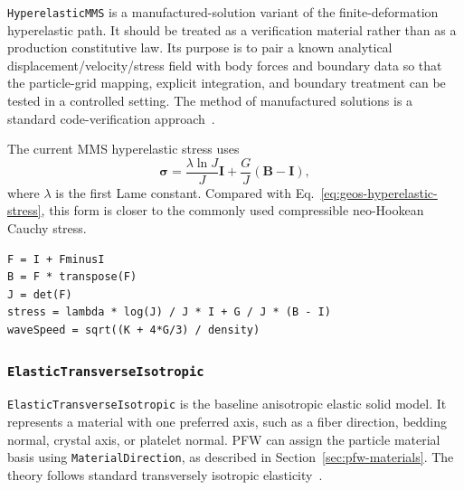 \texttt{HyperelasticMMS} is a manufactured-solution variant of the finite-deformation hyperelastic path.  It should be treated as a verification material rather than as a production constitutive law.  Its purpose is to pair a known analytical displacement/velocity/stress field with body forces and boundary data so that the particle-grid mapping, explicit integration, and boundary treatment can be tested in a controlled setting.  The method of manufactured solutions is a standard code-verification approach~\cite{roache1998}.

The current MMS hyperelastic stress uses
\begin{equation}
  \boldsymbol{\sigma}
  = \frac{\lambda \ln J}{J}\mathbf{I}
  + \frac{G}{J}(\mathbf{B}-\mathbf{I}),
  \label{eq:hyperelastic-mms-stress}
\end{equation}
where \(\lambda\) is the first Lame constant.  Compared with Eq.~\eqref{eq:geos-hyperelastic-stress}, this form is closer to the commonly used compressible neo-Hookean Cauchy stress.

\begin{lstlisting}[caption={HyperelasticMMS stress update.},label={alg:hyperelastic-mms-update},basicstyle=\ttfamily\small]
F = I + FminusI
B = F * transpose(F)
J = det(F)
stress = lambda * log(J) / J * I + G / J * (B - I)
waveSpeed = sqrt((K + 4*G/3) / density)
\end{lstlisting}

\subsubsection{\texttt{ElasticTransverseIsotropic}}
\label{subsubsec:elastic-transverse-isotropic-model}

\texttt{ElasticTransverseIsotropic} is the baseline anisotropic elastic solid model.  It represents a material with one preferred axis, such as a fiber direction, bedding normal, crystal axis, or platelet normal.  PFW can assign the particle material basis using \texttt{MaterialDirection}, as described in Section~\ref{sec:pfw-materials}.  The theory follows standard transversely isotropic elasticity~\cite{lekhnitskii1963}.

